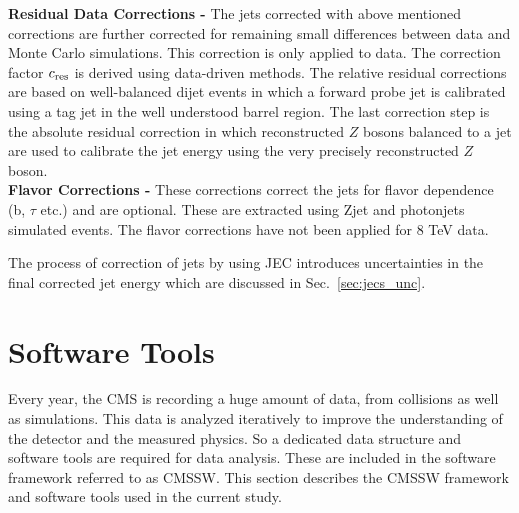{\bf Residual Data Corrections -} The jets corrected with above mentioned corrections are further corrected for remaining small differences between data and Monte Carlo simulations. This correction is only applied to data. The correction factor $c_{\rm res}$ is derived using data-driven methods. The relative residual corrections are based on well-balanced dijet events in which a forward probe jet is calibrated using a tag jet in the well understood barrel region. The last correction step is the absolute residual correction in which reconstructed $Z$ bosons balanced to a jet are used to calibrate the jet energy using the very precisely reconstructed $Z$ boson. \\ \newline
{\bf Flavor Corrections -} These corrections correct the jets for flavor dependence (b, $\tau$ etc.) and are optional. These are extracted using Z\plusn jet and photon\plusn jets simulated events. The flavor corrections have not been applied for 8 TeV data.

The process of correction of jets by using JEC introduces uncertainties in the final corrected jet energy which are discussed in Sec.~\ref{sec:jecs_unc}.

\section{Software Tools}
Every year, the CMS is recording a huge amount of data, from collisions as well as simulations. This data is analyzed iteratively to improve the understanding of the detector and the measured physics. So a dedicated data structure and software tools are required for data analysis. These are included in the software framework referred to as CMSSW. This section describes the CMSSW framework and software tools used in the current study.

